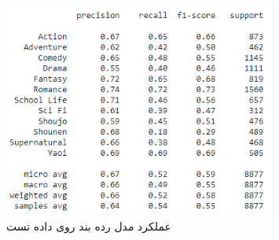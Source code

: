  
 \begin{figure}[H]
 	\centering
 	
 	\includegraphics[width=0.8\textwidth,height=0.8\textheight,keepaspectratio]{images/5-1}
 	\caption{عملکرد مدل رده بند روی داده تست}
 	\label{fig51}
 	
 \end{figure} 
 

